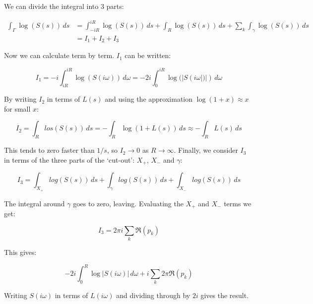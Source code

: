 \documentclass[11pt]{article} %
\begin{document}
We can divide the integral into 3 parts:

\begin{align}
\int_{\Gamma} \log(S(s))\,ds &= \int^{iR}_{-iR}\log(S(s))\,ds + \int_{R}\log(S(s))\,ds + \sum_{k}\int_{\gamma}\log(S(s))\,ds \\
&= I_{1} + I_{2} + I_{3}
\end{align}

Now we can calculate term by term. $I_{1}$ can be written:

\begin{equation}
I_{1} = -i\int^{iR}_{iR}\log(S(i \omega))\, d\omega = -2i\int^{iR}_{0}\log(|S(i\omega|)|)\, d\omega
\end{equation}

By writing $I_{2}$ in terms of $L(s)$ and using the approximation $\log(1 + x) \approx x$ for small $x$:

\begin{equation}
I_{2} = \int_{R}los(S(s))\, ds = -\int_{R}\log(1 + L(s))\, ds \approx -\int_{R}L(s)\, ds
\end{equation}

This tends to zero faster than $1/s$, so $I_{2} \to 0$ as $R \to \infty$. Finally, we consider $I_{3}$ in terms of the three parts of the `cut-out': $X_{+}$, $X_{-}$ and $\gamma$:

\begin{equation}
I_{3} = \int_{X_{+}}log(S(s))\, ds + \int_{\gamma}log(S(s))\, ds + \int_{X_{-}}log(S(s))\, ds
\end{equation}

The integral around $\gamma$ goes to zero, leaving. Evaluating the $X_{+}$ and $X_{-}$ terms we get:

\begin{equation}
I_{3} = 2\pi i \sum_{k}\Re(p_{k})
\end{equation}

This gives:

\begin{equation}
-2 i \int^{R}_{0}\log|S(i \omega)|\, d\omega + i \sum_{k} 2 \pi \Re(p_{k})
\end{equation}

Writing $S(i \omega)$ in terms of $L(i \omega)$ and dividing through by $2i$ gives the result.
\end{document}
